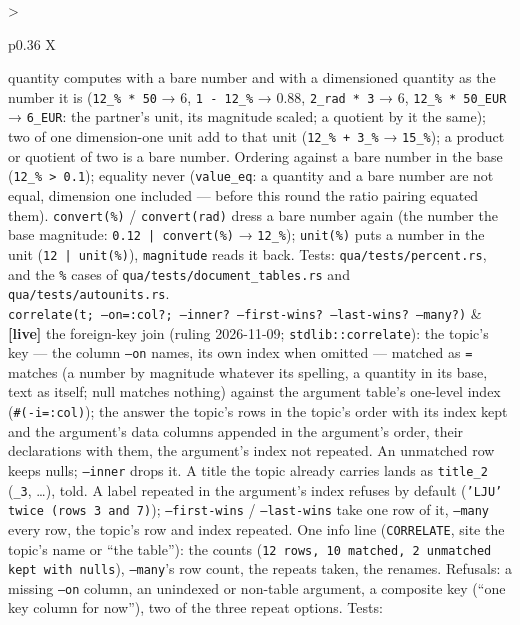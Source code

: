 \documentclass{report}
\newcommand{\live}{\textbf{\textcolor{blue!60!black}{[live]}}\xspace}
\begin{document}
\begin{xltabular}{\textwidth}{>{\raggedright\arraybackslash}p{0.36\textwidth} X}
    quantity computes with a bare number and with a dimensioned
    quantity as the number it is (\texttt{12\_\% * 50} → 6,
    \texttt{1 - 12\_\%} → 0.88, \texttt{2\_rad * 3} → 6, \texttt{12\_\% *
    50\_EUR} → \texttt{6\_EUR}: the partner's unit, its magnitude scaled;
    a quotient by it the same); two of one dimension-one unit add to
    that unit (\texttt{12\_\% + 3\_\%} → \texttt{15\_\%}); a product or
    quotient of two is a bare number. Ordering against a bare number
    in the base (\texttt{12\_\% > 0.1}); equality never
    (\texttt{value\_eq}: a quantity and a bare number are not equal,
    dimension one included — before this round the ratio pairing
    equated them). \texttt{convert(\%)} / \texttt{convert(rad)} dress a
    bare number again (the number the base magnitude: \texttt{0.12 |
    convert(\%)} → \texttt{12\_\%}); \texttt{unit(\%)} puts a number in
    the unit (\texttt{12 | unit(\%)}), \texttt{magnitude} reads it back.
    Tests: \texttt{qua/tests/percent.rs}, and the \texttt{\%} cases of
    \texttt{qua/tests/document\_tables.rs} and
    \texttt{qua/tests/autounits.rs}. \\
\texttt{correlate(t; --on=:col?; --inner? --first-wins? --last-wins? --many?)}
  & \live the foreign-key join (ruling 2026-11-09;
    \texttt{stdlib::correlate}): the topic's key — the column
    \texttt{--on} names, its own index when omitted — matched as
    \texttt{=} matches (a number by magnitude whatever its spelling, a
    quantity in its base, text as itself; null matches nothing) against
    the argument table's one-level index (\texttt{\#(-i=:col)}); the
    answer the topic's rows in the topic's order with its index kept
    and the argument's data columns appended in the argument's order,
    their declarations with them, the argument's index not repeated.
    An unmatched row keeps nulls; \texttt{--inner} drops it. A title
    the topic already carries lands as \texttt{title\_2}
    (\texttt{\_3}, …), told. A label repeated in the argument's index
    refuses by default (\texttt{'LJU' twice (rows 3 and 7)});
    \texttt{--first-wins} / \texttt{--last-wins} take one row of it,
    \texttt{--many} every row, the topic's row and index repeated.
    One info line (\texttt{CORRELATE}, site the topic's name or ``the
    table''): the counts (\texttt{12 rows, 10 matched, 2 unmatched kept
    with nulls}), \texttt{--many}'s row count, the repeats taken, the
    renames. Refusals: a missing \texttt{--on} column, an unindexed or
    non-table argument, a composite key (``one key column for now''),
    two of the three repeat options. Tests:

\end{xltabular}
\end{document}
